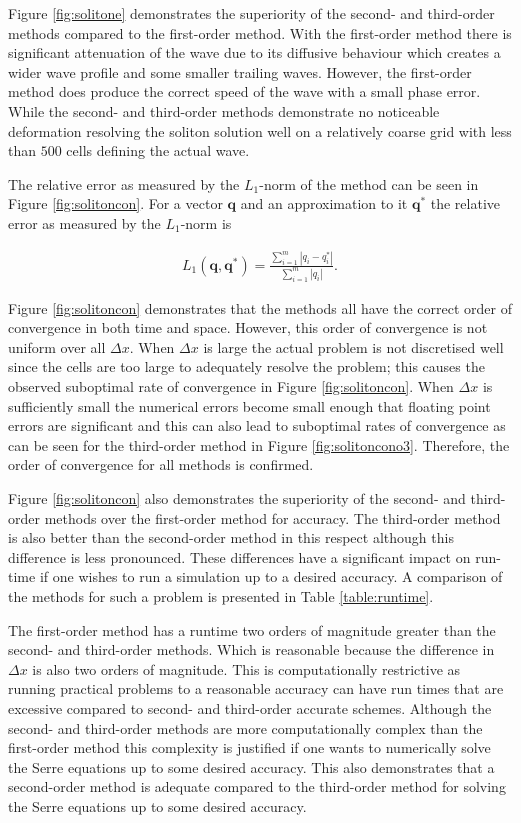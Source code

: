 \documentclass[SingleSpace,12pt,Proceedings]{Serre_ASCE}
\begin{document}
Figure \ref{fig:solitone} demonstrates the superiority of the second- and third-order methods compared to the first-order method. With the first-order method there is significant attenuation of the wave due to its diffusive behaviour which creates a wider wave profile and some smaller trailing waves. However, the first-order method does produce the correct speed of the wave with a small phase error. While the second- and third-order methods demonstrate no noticeable deformation resolving the soliton solution well on a relatively coarse grid with less than $500$ cells defining the actual wave.

The relative error as measured by the $L_1$-norm of the method can be seen in Figure \ref{fig:solitoncon}. For a vector $\boldsymbol{q}$ and an approximation to it $\boldsymbol{q}^*$ the relative error as measured by the $L_1$-norm is
\begin{linenomath*}
\begin{gather*}
L_1 \left(\boldsymbol{q},\boldsymbol{q}^*\right) = \frac{\sum_{i=1}^{m} |q_i - q^*_i|}{\sum_{i=1}^{m} |q_i|}.
\end{gather*}
\end{linenomath*}

Figure \ref{fig:solitoncon} demonstrates that the methods all have the correct order of convergence in both time and space. However, this order of convergence is not uniform over all $\Delta x$. When $\Delta x$ is large the actual problem is not discretised well since the cells are too large to adequately resolve the problem; this causes the observed suboptimal rate of convergence in Figure \ref{fig:solitoncon}. When $\Delta x$ is sufficiently small the numerical errors become small enough that floating point errors are significant and this can also lead to suboptimal rates of convergence as can be seen for the third-order method in Figure \ref{fig:solitoncono3}. Therefore, the order of convergence for all methods is confirmed.

Figure \ref{fig:solitoncon} also demonstrates the superiority of the second- and third-order methods over the first-order method for accuracy. The third-order method is also better than the second-order method in this respect although this difference is less pronounced. These differences have a significant impact on run-time if one wishes to run a simulation up to a desired accuracy. A comparison of the methods for such a problem is presented in Table \ref{table:runtime}.

The first-order method has a runtime two orders of magnitude greater than the second- and third-order methods. Which is reasonable because the difference in $\Delta x$ is also two orders of magnitude. This is computationally restrictive as running practical problems to a reasonable accuracy can have run times that are excessive compared to second- and third-order accurate schemes. Although the second- and third-order methods are more computationally complex than the first-order method this complexity is justified if one wants to numerically solve the Serre equations up to some desired accuracy. This also demonstrates that a second-order method is adequate compared to the third-order method for solving the Serre equations up to some desired accuracy.    
\end{document}
